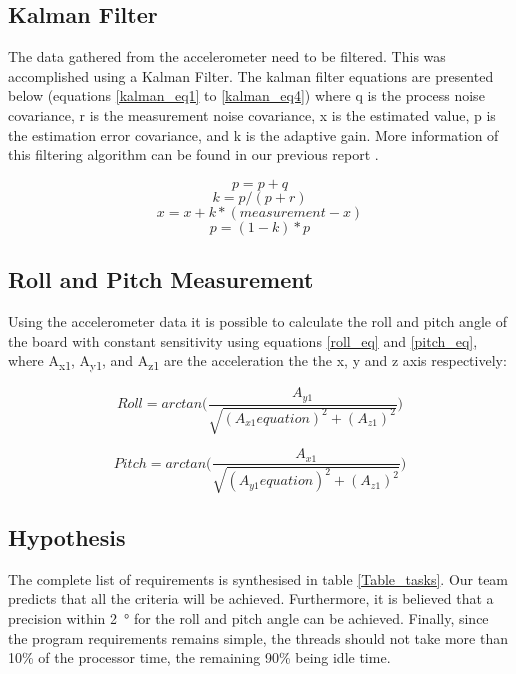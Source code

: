 \documentclass[12pt]{article}
\begin{document}
\subsection{Kalman Filter}
The data gathered from the accelerometer need to be filtered. This was accomplished using a Kalman Filter. The kalman filter equations are presented below (equations \ref{kalman_eq1} to \ref{kalman_eq4}) where q is the process noise covariance, r is the measurement noise covariance, x is the estimated value, p is the estimation error covariance, and k is the adaptive gain. More information of this filtering algorithm can be found in our previous report \cite{Lab2report}.

\begin{equation}
\label{kalman_eq1}
p=p+q
\end{equation}
\begin{equation}
k=p/(p+r)
\end{equation}
\begin{equation}
x=x+k*(measurement-x)
\end{equation}
\begin{equation}
\label{kalman_eq4}
p=(1-k)*p
\end{equation}

\subsection{Roll and Pitch Measurement}
Using the accelerometer data it is possible to calculate the roll and pitch angle of the board with constant sensitivity using equations \ref{roll_eq} and \ref{pitch_eq}, where A\textsubscript{x1}, A\textsubscript{y1}, and A\textsubscript{z1} are the acceleration the the x, y and z axis respectively:

\begin{equation}
\label{roll_eq}
Roll = arctan \Bigg( \frac{A_{y1}}{\sqrt{(A_{x1}equation)^2+(A_{z1})^2}} \Bigg)
\end{equation}

\begin{equation}
\label{pitch_eq}
Pitch=arctan \Bigg( \frac{A_{x1}}{\sqrt{(A_{y1}equation)^2+(A_{z1})^2}} \Bigg)
\end{equation}

\subsection{Hypothesis}
The complete list of requirements is synthesised in table \ref{Table_tasks}. Our team predicts that all the criteria will be achieved. Furthermore, it is believed that a precision within \SI{2}{\degree} for the roll and pitch angle can be achieved. Finally, since the program requirements remains simple, the threads should not take more than 10\% of the processor time, the remaining 90\% being idle time.
\end{document}
